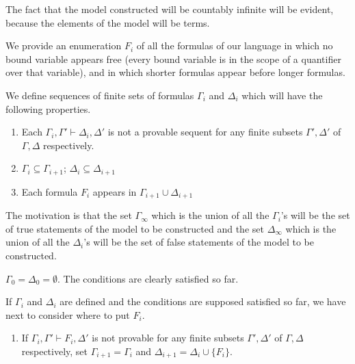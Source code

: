 \documentclass[12pt]{book}
\begin{document}
\begin{description}
The fact that the model constructed will be countably infinite will be
evident, because the elements of the model will be terms.

We provide an enumeration $F_i$ of all the formulas of our language in
which no bound variable appears free (every bound variable is in the
scope of a quantifier over that variable), and in which shorter
formulas appear before longer formulas.

We define sequences of finite sets of formulas $\Gamma_i$ and $\Delta_i$
which will have the following properties.

\begin{enumerate}

\item Each $\Gamma_i,\Gamma' \vdash \Delta_i,\Delta'$ is not a
provable sequent for any finite subsets $\Gamma',\Delta'$ of
$\Gamma,\Delta$ respectively.

\item $\Gamma_{i} \subseteq \Gamma_{i+1}$; $\Delta_{i} \subseteq \Delta_{i+1}$

\item Each formula $F_i$ appears in $\Gamma_{i+1} \cup \Delta_{i+1}$

\end{enumerate}

The motivation is that the set $\Gamma_{\infty}$ which is the union of
all the $\Gamma_i$'s will be the set of true statements of the model
to be constructed and the set $\Delta_{\infty}$ which is the union of
all the $\Delta_i$'s will be the set of false statements of the model
to be constructed.

\newpage

$\Gamma_0=\Delta_0=\emptyset$.  The conditions are clearly satisfied
so far.

If $\Gamma_i$ and $\Delta_i$ are defined and the conditions are
supposed satisfied so far, we have next to consider where to put
$F_i$.

\begin{enumerate}

\item If $\Gamma_i,\Gamma' \vdash F_i,\Delta'$ is not provable
for any finite subsets $\Gamma',\Delta'$ of $\Gamma,\Delta$
respectively, set $\Gamma_{i+1}=\Gamma_i$ and
$\Delta_{i+1}=\Delta_i\cup \{F_i\}$.


\end{enumerate}
\end{description}
\end{document}
